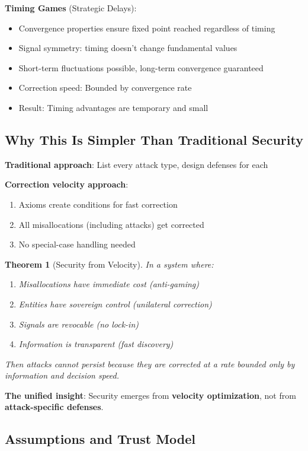 \documentclass[11pt,a4paper]{article}
\newtheorem{theorem}{Theorem}[section]
\theoremstyle{definition}
\theoremstyle{remark}
\begin{document}
\textbf{Timing Games} (Strategic Delays):
\begin{itemize}
\item Convergence properties ensure fixed point reached regardless of timing
\item Signal symmetry: timing doesn't change fundamental values
\item Short-term fluctuations possible, long-term convergence guaranteed
\item Correction speed: Bounded by convergence rate
\item Result: Timing advantages are temporary and small
\end{itemize}

\subsection{Why This Is Simpler Than Traditional Security}

\textbf{Traditional approach}: List every attack type, design defenses for each

\textbf{Correction velocity approach}:
\begin{enumerate}
\item Axioms create conditions for fast correction
\item All misallocations (including attacks) get corrected
\item No special-case handling needed
\end{enumerate}

\begin{theorem}[Security from Velocity]
In a system where:
\begin{enumerate}
\item Misallocations have immediate cost (anti-gaming)
\item Entities have sovereign control (unilateral correction)
\item Signals are revocable (no lock-in)
\item Information is transparent (fast discovery)
\end{enumerate}

Then attacks cannot persist because they are corrected at a rate bounded only by information and decision speed.
\end{theorem}

\textbf{The unified insight}: Security emerges from \textbf{velocity optimization}, not from \textbf{attack-specific defenses}.

\subsection{Assumptions and Trust Model}
\end{document}

